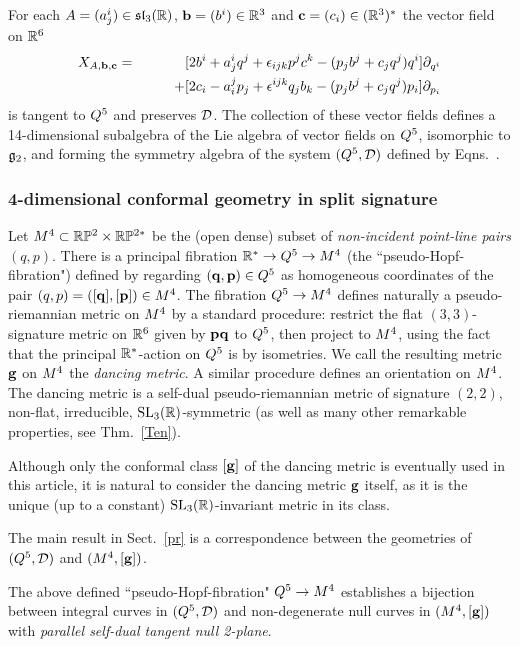  
\begin{cor}\label{cor1}For  each  $A=(a^i_j)\in\mathfrak{sl}_3(\mathbb{R})$, ${\bf b}=(b^i)\in \mathbb{R}^3$ and ${\bf c}=(c_i) \in (\mathbb{R}^3)^*$  the vector field   on $\mathbb{R}^6$ 
\begin{eqnarray*}
X_{A,{\bf b}, {\bf c}}&=&[ 2b^i + a^i_jq^j + \epsilon_{ijk}p^j c^k -(p_jb^j+ c_j q^j)q^i]\partial_{q^i} 
\\ &&
\qquad+[2c_i-a_i^jp_j  + \epsilon^{ijk}q_j b_k- (p_j b^j +c_j q^j )p_i]\partial_{p_i }
\end{eqnarray*}
is tangent to $Q^5$ and preserves ${\mathcal D}$. The collection of these vector fields defines a 14-dimensional subalgebra of the Lie algebra of vector fields on $Q^5$, isomorphic to ${\mathfrak{g}}_2$, and forming the symmetry algebra of the system $(Q^5, {\mathcal D})$ defined by Eqns.~\eqns.
\end{cor}

\subsubsection{4-dimensional conformal  geometry in split signature}
Let $M^4\subset\mathbb{R}\mathbb{P}^2\times\mathbb{R}\mathbb{P}^{2*}$ be the (open dense) subset of {\em non-incident point-line pairs} $(q,p).$ There is a principal fibration 
 $\mathbb{R}^*\to Q^5\to M^4$ (the ``pseudo-Hopf-fibration") defined by regarding $(\mathbf q,{\mathbf p})\in Q^5$ as  homogeneous coordinates  of the pair $(q,p)=([\mathbf q], [{\mathbf p}])\in M^4$. The fibration $Q^5\to M^4$ defines naturally a  pseudo-riemannian metric on  $M^4$  by  a  standard procedure: restrict the flat $(3,3)$-signature metric on $\mathbb{R}^6$ given by ${\mathbf p}\mathbf q$  to $Q^5$, then project to $M^4$, using the fact that the principal $\mathbb{R}^*$-action on $Q^5$ is by isometries. We call the resulting metric $\mathbf{ g}$ on $M^4$  the {\em dancing metric}. A similar procedure defines an orientation on $M^4$. The dancing metric is a self-dual pseudo-riemannian metric of signature $(2,2)$, non-flat, irreducible,  ${\mathrm{SL}_3(\mathbb{R})}$-symmetric (as well as many other remarkable properties, see Thm.~\ref{Ten}). 

\begin{rmrk} Although only the conformal class $[\mathbf{ g}]$ of the dancing metric is eventually used in this article, it is natural to consider the dancing metric $\mathbf{ g}$ itself, as it is the unique (up to a constant)  ${\mathrm{SL}_3(\mathbb{R})}$-invariant metric in its class.
\end{rmrk}

 The main result in Sect.~\ref{pr} is  a correspondence between the geometries   of  $(Q^5,{\mathcal D})$ and $(M^4,[\mathbf{ g}])$. 

\begin{theorem}
The  above defined ``pseudo-Hopf-fibration"  $Q^5\to M^4$  establishes a bijection between  integral curves in   $(Q^5,{\mathcal D})$   and non-degenerate  null curves in $(M^4,[\mathbf{ g}])$ with   {\em parallel self-dual tangent null 2-plane}.\end{theorem}


